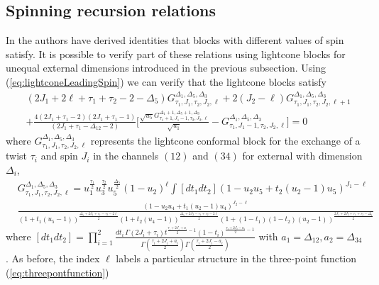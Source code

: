 \subsection{Spinning recursion relations}
In \cite{Poland:2021xjs} the authors have derived identities that blocks with different values of spin satisfy. It is possible to verify part of these relations using lightcone blocks for unequal external dimensions introduced in the previous subsection. Using (\ref{eq:lightconeLeadingSpin}) we can verify that the lightcone blocks satisfy
\begin{align}
   & (2 J_1+2 \ell+\tau_1+\tau_2-2-\Delta_5) G_{\tau_1,J_1,\tau_2,J_2,\ell}^{\Delta_{1},\Delta_5,\Delta_3}
  + 2 (J_2-\ell) G_{\tau_1,J_1,\tau_2,J_2,\ell+1}^{\Delta_{1},\Delta_5,\Delta_3}
  \label{eq:RecurrencerelationJ}                                                                                                                                                                                                                                              \\
   & +\frac{4 (2 J_1+\tau_1-2) (2 J_1+\tau_1-1) }{(2 J_1+\tau_1-\Delta_{12}-2) }\bigg[\frac{\sqrt{u_5}  G_{\tau_1+1,J_1-1,\tau_2,J_2,\ell}^{\Delta_{1}+1,\Delta_5+1,\Delta_3} }{\sqrt{u_1} }-G_{\tau_1,J_1-1,\tau_2,J_2,\ell}^{\Delta_{1},\Delta_5,\Delta_3}\bigg]=0\nonumber
\end{align}
where $G_{\tau_1,J_1,\tau_2,J_2,\ell}^{\Delta_1,\Delta_5,\Delta_3}$ represents the lightcone conformal block for the exchange of a twist $\tau_i$ and spin $J_i$ in the channels $(12)$ and $(34)$ for external with dimension $\Delta_i$,\begin{align}
   & G_{\tau_1,J_1,\tau_2,J_2,\ell}^{\Delta_1,\Delta_5,\Delta_3} =  u_1^{\frac{\tau_1}{2}}  u_3^{\frac{\tau_2}{2}}u_5^{\frac{\Delta_5}{2}}(1-u_2)^{\ell} \int [dt_1dt_2] (1-u_2 u_5+t_2 (u_2-1) u_5)^{J_1-\ell }                                                                  \\
   & \tfrac{(1-u_2 u_4+t_1 (u_2-1) u_4)^{J_2-\ell } }{(1+t_1 (u_5-1))^{\frac{\Delta_5+2 J_1+\tau_1-\tau_2-2 \ell }{2} }  (1+t_2 (u_4-1))^{\frac{\Delta_5+2 J_2-\tau_1+\tau_2-2 \ell}{2}}  (1+(1-t_1) (1-t_2) (u_2-1))^{\frac{2 J_1+2 J_2+\tau_1+\tau_2-\Delta_5}{2} } } \nonumber
\end{align}
where $[dt_1dt_2] = \prod_{i=1}^2\frac{dt_i\,\Gamma(2J_i+\tau_i)t^{\frac{\tau_i+2J_i+a_i}{2}-1}(1-t_i)^{\frac{\tau_i+2J_i-a_i}{2}-1}}{\Gamma\left(\frac{\tau_i+2J_i+a_i}{2}\right)\Gamma\left(\frac{\tau_i+2J_i-a_i}{2}\right) }$ with $a_1=\Delta_{12}, a_2=\Delta_{34}$.
As before, the index $\ell$ labels a particular structure in the three-point function (\ref{eq:threepontfunction}) 

